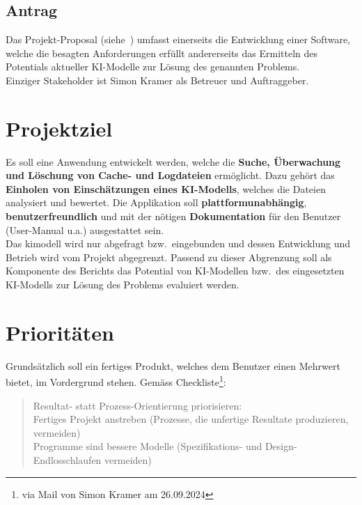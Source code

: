 \documentclass[a4paper,12pt]{report}
\begin{document}
    \subsection{Antrag}\label{subsec:stakeholder}
    Das Projekt-Proposal (siehe~) umfasst einerseits die Entwicklung einer Software, welche die besagten Anforderungen erfüllt
    andererseits das Ermitteln des Potentials aktueller KI-Modelle zur Lösung des genannten Problems.\\
    Einziger Stakeholder ist Simon Kramer als Betreuer und Auftraggeber.\\


    \section{Projektziel}\label{sec:projektziel}
    Es soll eine Anwendung entwickelt werden, welche die \textbf{Suche, Überwachung und Löschung von Cache- und Logdateien} ermöglicht.
    Dazu gehört das \textbf{Einholen von Einschätzungen eines KI-Modells}, welches die Dateien analysiert und bewertet.
    Die Applikation soll \textbf{plattformunabhängig}, \textbf{benutzerfreundlich} und mit der nötigen \textbf{Dokumentation} für den Benutzer (User-Manual u.a.) ausgestattet sein.
    \\Das \gls{kimodell} wird nur abgefragt bzw.\ eingebunden und dessen Entwicklung und Betrieb
    wird vom Projekt abgegrenzt.
    Passend zu dieser Abgrenzung soll als Komponente des Berichts das Potential von KI-Modellen bzw.\ des eingesetzten KI-Modells zur Lösung des Problems evaluiert werden.


    \section{Prioritäten}
    Grundsätzlich soll ein fertiges Produkt, welches dem Benutzer einen Mehrwert bietet, im Vordergrund stehen.
    Gemäss Checkliste\footnote{via Mail von Simon Kramer am 26.09.2024}:
    \begin{quote}
        Resultat- statt Prozess-Orientierung priorisieren:
        \\Fertiges Projekt anstreben (Prozesse, die unfertige Resultate produzieren, vermeiden)
        \\Programme sind bessere Modelle (Spezifikations- und Design-Endlosschlaufen vermeiden)
    \end{quote}
\end{document}
